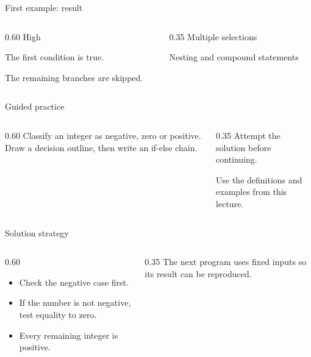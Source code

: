 \documentclass[10pt,aspectratio=169]{beamer}
\begin{document}
\begin{frame}[fragile,t]{First example: result}
\begin{columns}[T,onlytextwidth]\begin{column}{0.60\textwidth}
High\par The first condition is true.\par The remaining branches are skipped.
\end{column}\begin{column}{0.35\textwidth}\small
Multiple selections

Nesting and compound statements
\end{column}\end{columns}
\end{frame}

\begin{frame}[fragile,t]{Guided practice}
\begin{columns}[T,onlytextwidth]\begin{column}{0.60\textwidth}
Classify an integer as negative, zero or positive. Draw a decision outline, then write an if-else chain.
\end{column}\begin{column}{0.35\textwidth}\small
Attempt the solution before continuing.

Use the definitions and examples from this lecture.
\end{column}\end{columns}
\end{frame}

\begin{frame}[fragile,t]{Solution strategy}
\begin{columns}[T,onlytextwidth]\begin{column}{0.60\textwidth}
\begin{itemize}
\item Check the negative case first.
\item If the number is not negative, test equality to zero.
\item Every remaining integer is positive.
\end{itemize}
\end{column}\begin{column}{0.35\textwidth}\small
The next program uses fixed inputs so its result can be reproduced.
\end{column}\end{columns}
\end{frame}
\end{document}
